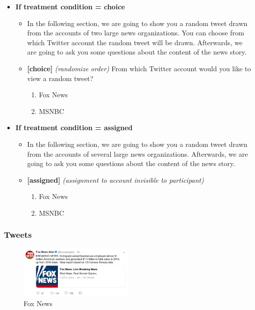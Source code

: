 \documentclass[
]{article}
\providecommand{\tightlist}{%
  \setlength{\itemsep}{0pt}\setlength{\parskip}{0pt}}
\begin{document}
\begin{itemize}
\tightlist
\item
  \textbf{If treatment condition = choice}

  \begin{itemize}
  \item
    In the following section, we are going to show you a random tweet
    drawn from the accounts of two large news organizations. You can
    choose from which Twitter account the random tweet will be drawn.
    Afterwards, we are going to ask you some questions about the content
    of the news story.
  \item
    \textbf{{[}choice{]}} \emph{(randomize order)} From which Twitter
    account would you like to view a random tweet?

    \begin{enumerate}
    \def\labelenumi{\arabic{enumi}.}
    \tightlist
    \item
      Fox News
    \item
      MSNBC
    \end{enumerate}
  \end{itemize}
\item
  \textbf{If treatment condition = assigned}

  \begin{itemize}
  \item
    In the following section, we are going to show you a random tweet
    drawn from the accounts of several large news organizations.
    Afterwards, we are going to ask you some questions about the content
    of the news story.
  \item
    \textbf{{[}assigned{]}} \emph{(assignment to account invisible to
    participant)}

    \begin{enumerate}
    \def\labelenumi{\arabic{enumi}.}
    \tightlist
    \item
      Fox News
    \item
      MSNBC
    \end{enumerate}
  \end{itemize}
\end{itemize}

\hypertarget{tweets}{%
\subsubsection{Tweets}\label{tweets}}

\begin{figure}
\centering
\includegraphics[width=0.5\textwidth,height=\textheight]{../material/tweets/fox_popular.png}
\caption{Fox News}
\end{figure}
\end{document}
